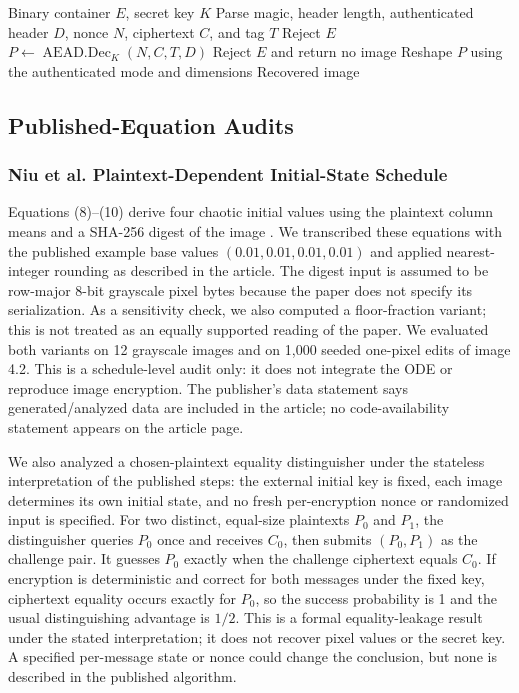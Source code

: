\documentclass[letterpaper,journal]{IEEEtran}
\begin{document}
\begin{algorithm}[!t]
\caption{AEAD image decryption (opening)}
\label{alg:open}
\begin{algorithmic}[1]
\REQUIRE Binary container $E$, secret key $K$
\STATE Parse magic, header length, authenticated header $D$, nonce $N$, ciphertext $C$, and tag $T$
  \STATE Reject $E$
\ENDIF
\STATE $P \leftarrow \operatorname{AEAD.Dec}_{K}(N,C,T,D)$
  \STATE Reject $E$ and return no image
\ENDIF
\STATE Reshape $P$ using the authenticated mode and dimensions
\RETURN Recovered image
\end{algorithmic}
\end{algorithm}

\subsection{Published-Equation Audits}
\subsubsection{Niu et al. Plaintext-Dependent Initial-State Schedule}
Equations (8)--(10) derive four chaotic initial values using the plaintext column means and a SHA-256 digest of the image \cite{niu2024}. We transcribed these equations with the published example base values $(0.01,0.01,0.01,0.01)$ and applied nearest-integer rounding as described in the article. The digest input is assumed to be row-major 8-bit grayscale pixel bytes because the paper does not specify its serialization. As a sensitivity check, we also computed a floor-fraction variant; this is not treated as an equally supported reading of the paper. We evaluated both variants on 12 grayscale images and on 1,000 seeded one-pixel edits of image 4.2. This is a schedule-level audit only: it does not integrate the ODE or reproduce image encryption. The publisher's data statement says generated/analyzed data are included in the article; no code-availability statement appears on the article page.

We also analyzed a chosen-plaintext equality distinguisher under the stateless interpretation of the published steps: the external initial key is fixed, each image determines its own initial state, and no fresh per-encryption nonce or randomized input is specified. For two distinct, equal-size plaintexts $P_0$ and $P_1$, the distinguisher queries $P_0$ once and receives $C_0$, then submits $(P_0,P_1)$ as the challenge pair. It guesses $P_0$ exactly when the challenge ciphertext equals $C_0$. If encryption is deterministic and correct for both messages under the fixed key, ciphertext equality occurs exactly for $P_0$, so the success probability is 1 and the usual distinguishing advantage is $1/2$. This is a formal equality-leakage result under the stated interpretation; it does not recover pixel values or the secret key. A specified per-message state or nonce could change the conclusion, but none is described in the published algorithm.
\end{document}
